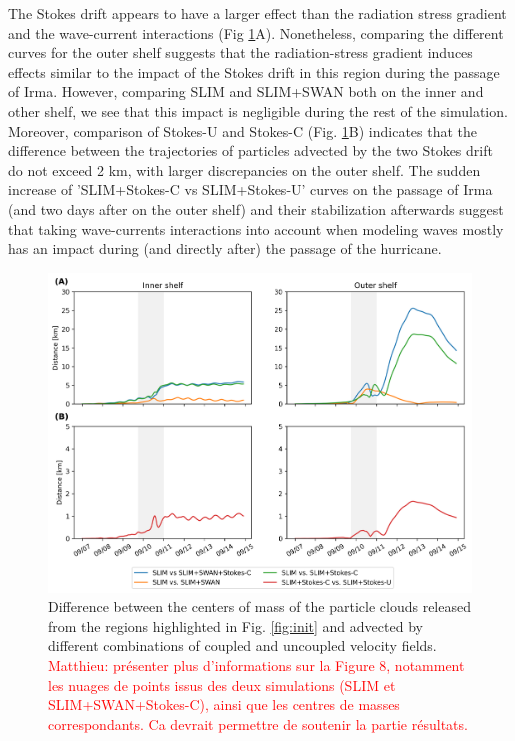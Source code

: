 \documentclass[preprint,12pt,authoryear]{elsarticle}
\begin{document}
The Stokes drift appears to have a larger effect than the radiation stress gradient and the wave-current interactions (Fig \ref{fig:traj}A). Nonetheless, comparing the different curves for the outer shelf suggests that the radiation-stress gradient induces effects similar to the impact of the Stokes drift in this region during the passage of Irma. However, comparing SLIM and SLIM+SWAN both on the inner and other shelf, we see that this impact is negligible during the rest of the simulation. Moreover, comparison of Stokes-U and Stokes-C (Fig. \ref{fig:traj}B) indicates that the difference between the trajectories of particles advected by the two Stokes drift do not exceed 2 km, with larger discrepancies on the outer shelf. The sudden increase of 'SLIM+Stokes-C vs SLIM+Stokes-U' curves on the passage of Irma (and two days after on the outer shelf) and their stabilization afterwards suggest that taking wave-currents interactions into account when modeling waves mostly has an impact during (and directly after) the passage of the hurricane.


\begin{figure}
    \centering
    \includegraphics[width=.99\textwidth]{fig/inner_outer.png}
    \caption{Difference between the centers of mass of the particle clouds released from the regions highlighted in Fig. \ref{fig:init} and advected by different combinations of coupled and uncoupled velocity fields. \textcolor{red}{Matthieu: présenter plus d'informations sur la Figure 8, notamment les nuages de points issus des deux simulations (SLIM et SLIM+SWAN+Stokes-C), ainsi que les centres de masses correspondants. Ca devrait permettre de soutenir la partie résultats.}}
    \label{fig:traj}
\end{figure}
\end{document}
